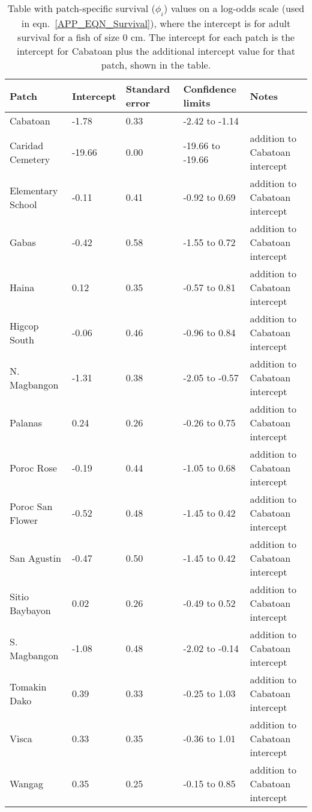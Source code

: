 \documentclass[12pt, oneside]{article}   	%
\begin{document}
\begin{table}[!htbp] 
\begin{centering}
\caption{Table with patch-specific survival ($\phi_i$) values on a log-odds scale (used in eqn.\ \ref{APP_EQN_Survival}), where the intercept is for adult survival for a fish of size 0 cm. The intercept for each patch is the intercept for Cabatoan plus the additional intercept value for that patch, shown in the table.} \label{APP_TAB_SiteSurvivals}
\begin{tabular}{|p{1.1in}|p{0.75in}|p{0.75in}|p{1.25in}|p{1.5in}|}
\hline 
\textbf{Patch} & \textbf{Intercept} & \textbf{Standard error} & \textbf{Confidence limits} & \textbf{Notes} \\ \hline
Cabatoan & -1.78 & 0.33 & -2.42 to -1.14 & \\ \hline
Caridad Cemetery & -19.66 & 0.00 & -19.66 to -19.66 & addition to Cabatoan intercept \\ \hline
Elementary School & -0.11 & 0.41 & -0.92 to 0.69 & addition to Cabatoan intercept \\ \hline
Gabas & -0.42 & 0.58 & -1.55 to 0.72 & addition to Cabatoan intercept \\ \hline
Haina & 0.12 & 0.35 & -0.57 to 0.81 & addition to Cabatoan intercept \\ \hline
Higcop South & -0.06 & 0.46 & -0.96 to 0.84 & addition to Cabatoan intercept \\ \hline
N. Magbangon & -1.31 & 0.38 & -2.05 to -0.57 & addition to Cabatoan intercept \\ \hline
Palanas & 0.24 & 0.26 & -0.26 to 0.75 & addition to Cabatoan intercept \\ \hline
Poroc Rose & -0.19 & 0.44 & -1.05 to 0.68 & addition to Cabatoan intercept \\ \hline
Poroc San Flower & -0.52 & 0.48 & -1.45 to 0.42 & addition to Cabatoan intercept \\ \hline
San Agustin & -0.47 & 0.50 & -1.45 to 0.42 & addition to Cabatoan intercept \\ \hline
Sitio Baybayon & 0.02 & 0.26 & -0.49 to 0.52 & addition to Cabatoan intercept \\ \hline
S. Magbangon & -1.08 & 0.48 & -2.02 to -0.14 & addition to Cabatoan intercept \\ \hline
Tomakin Dako & 0.39 & 0.33 & -0.25 to 1.03 & addition to Cabatoan intercept \\ \hline
Visca & 0.33 & 0.35 & -0.36 to 1.01 & addition to Cabatoan intercept \\ \hline
Wangag & 0.35 & 0.25 & -0.15 to 0.85 & addition to Cabatoan intercept \\ \hline
\end{tabular}
\end{centering}
\end{table}
\end{document}
